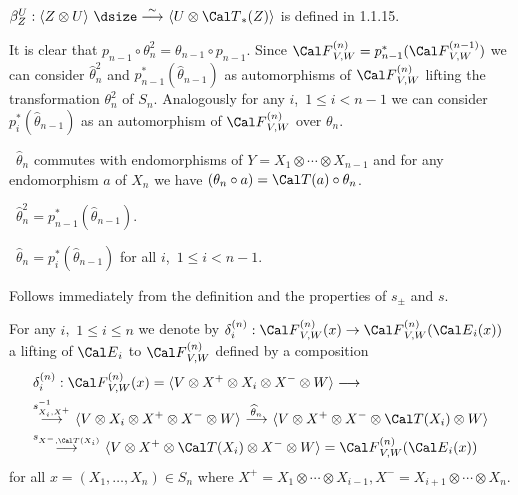 \noindent
$\beta^U_Z: \langle Z \otimes U\rangle\
{\dsize\buildrel{\sim}\over\longrightarrow}\ \langle U \otimes {\Cal
T}_*(Z)\rangle$
is defined in 1.1.15.
\endproclaim

It is clear that  $p_{n-1} \circ \theta^2_n = \theta_{n-1} \circ p_{n-1}$.
Since  ${\Cal F}^{(n)}_{V,W} = p^*_{n-1}({\Cal F}^{(n-1)}_{V,W})$  we can
consider
$\widehat{\theta}^2_n$  and  $p^*_{n-1}(\widehat{\theta}_{n-1})$  as
automorphisms
of ${\Cal F}^{(n)}_{V,W}$  lifting the transformation  $\theta^2_n$ of $S_n$.
Analogously for any $i$,\ $1 \le i < n-1$  we can consider
$p^*_i(\widehat{\theta}_{n-1})$  as an automorphism of  ${\Cal F}^{(n)}_{V,W}$
over  $\theta_n$.



\ $\widehat{\theta}_n$  commutes with endomorphisms of
$Y = X_1 \otimes \cdots \otimes X_{n-1}$  and for any endomorphism  $a$ of
$X_n$  we have  $(\theta_n \circ a) = {\Cal T}(a) \circ \theta_n$.

\ $\widehat{\theta}^2_n = p^*_{n-1}(\widehat{\theta}_{n-1})$.

\ $\widehat{\theta}_n = p^*_i(\widehat{\theta}_{n-1})$  for all
$i$,\ $1 \le i < n-1$.
\endproclaim

  Follows immediately from the definition and the properties of
$s_\pm$ and $s$.
\enddemo

  For any $i$,\ $1 \le i \le n$  we denote by
$\delta_i^{(n)}: {\Cal F}^{(n)}_{V,W}(x) \to {\Cal F}^{(n)}_{V,W}({\Cal
E}_i(x))$
a lifting of  ${\Cal E}_i$  to ${\Cal F}^{(n)}_{V,W}$  defined by a composition
$$
\aligned
& \delta_i^{(n)}: {\Cal F}^{(n)}_{V,W}(x) = \langle V \otimes X^+ \otimes
X_i \otimes X^- \otimes W\rangle \longrightarrow\\
&{\buildrel {s^{-1}_{X_i,X^+}}\over\longrightarrow}\ \langle V \otimes X_i
\otimes X^+ \otimes X^- \otimes W\rangle\
{\buildrel {\widehat{\theta}_n}\over\longrightarrow}\
\langle V \otimes X^+ \otimes X^-  \otimes {\Cal T}(X_i) \otimes W\rangle\\
& {\buildrel {s_{X^-,{\Cal T}(X_i)}}\over\longrightarrow}\
\langle V \otimes X^+ \otimes {\Cal T}(X_i) \otimes X^- \otimes W\rangle =
{\Cal F}^{(n)}_{V,W}({\Cal E}_i(x))
\endaligned
$$
for all $x = (X_1,\ldots,X_n) \in S_n$  where  $X^+ = X_1 \otimes \cdots
\otimes X_{i-1}, X^- = X_{i+1} \otimes \cdots \otimes X_n$.
\endproclaim

\proclaim{{\bf 1.2.8}\ Proposition}

